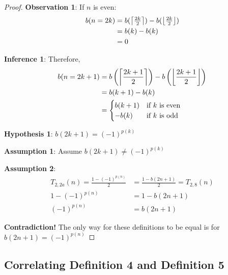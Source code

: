 \documentclass[conference]{IEEEtran}
\begin{document}
\begin{proof}
    \textbf{Observation 1}: If $n$ is even:\begin{equation}\begin{aligned}    
    b(n = 2k) &= b(\left\lceil \tfrac{2k}{2} \right\rceil) - b(\left\lfloor \tfrac{2k}{2} \right\rfloor) \\
    &= b(k) - b(k) \\&= 0
    \end{aligned}
    \end{equation}

    \textbf{Inference 1}: Therefore, \begin{equation}
\begin{aligned}
    b(n=2k+1) &= b\left(\left\lceil \dfrac{2k+1}{2} \right\rceil\right) - b\left(\left\lfloor \dfrac{2k+1}{2} \right\rfloor\right) \\
              &= b(k + 1) - b(k) \\
              &= \begin{cases}
                  b(k+1) & \text{if } k \text{ is even} \\
                  -b(k)  & \text{if } k \text{ is odd}
              \end{cases}
\end{aligned}
    \end{equation}

    \textbf{Hypothesis 1}: $b(2k+1) = (-1)^{p(k)}$

    \textbf{Assumption 1}: Assume $b(2k+1) \ne (-1)^{p(k)}$

    \textbf{Assumption 2}: \begin{equation}\begin{aligned}
    T_{2,2a}(n) = \tfrac{1 - (-1)^{p(n)}}{2} &= \tfrac{1 - b(2n+1)}{2} = T_{2,8}(n) \\
    1 - (-1)^{p(n)} &= 1 - b(2n+1) \\
    (-1)^{p(n)} &= b(2n+1)
    \end{aligned}
    \end{equation}

    \textbf{Contradiction!} The only way for these definitions to be equal is for $b(2n+1) = (-1)^{p(n)}$

\end{proof}

\subsection{Correlating Definition 4 and Definition 5}
\end{document}
